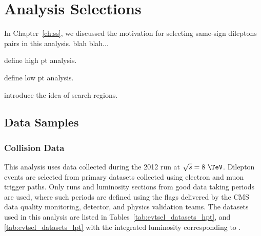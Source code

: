\chapter{Analysis Selections}
\label{ch:evtsel}
In Chapter~\ref{ch:ss}, we discussed the motivation for selecting same-sign
dileptons pairs in this analysis. blah blah...

define high pt analysis. 

define low pt analysis.

introduce the idea of search regions. 

\section{Data Samples}
\label{sec:evtsel_samples}

\subsection{Collision Data}
\label{sec:evtsel_samples_data}
This analysis uses data collected during the 2012 run at $\sqrt{s} = 8\ \TeV$.
Dilepton events are selected from primary datasets collected using electron and
muon trigger paths. Only runs and luminosity sections from good data taking
periods are used, where such periods are defined using the flags delivered by
the CMS data quality monitoring, detector, and physics validation teams. The
datasets used in this analysis are listed in Tables~\ref{tab:evtsel_datasets_hpt},
and \ref{tab:evtsel_datasets_lpt} with the integrated luminosity corresponding to
\usedLumi.

